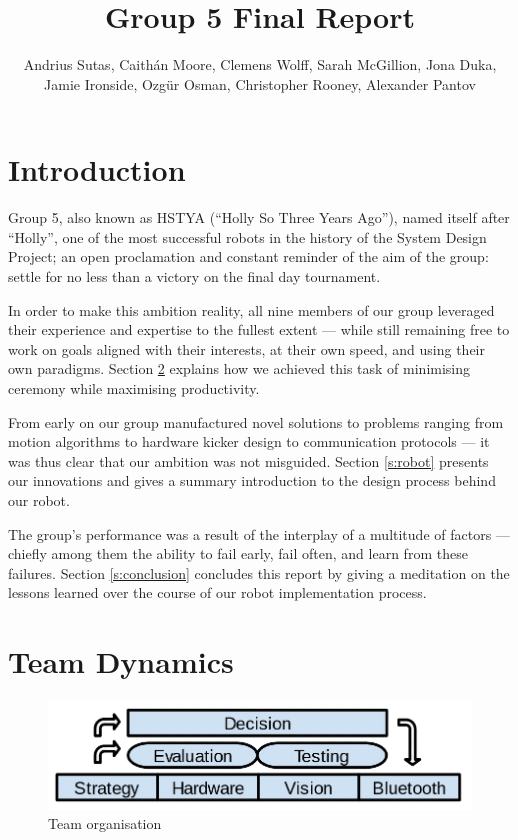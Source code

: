 \documentclass[journal,a4paper,12pt]{IEEEtran}
\title{Group 5 Final Report}
\author{Andrius Sutas, Caith\'{a}n Moore, Clemens Wolff, Sarah McGillion, Jona Duka, Jamie Ironside, Ozg\"{u}r Osman, Christopher Rooney, Alexander Pantov}
\begin{document}
\maketitle


\section{Introduction}\label{s:introduction}

Group 5, also known as HSTYA (``Holly So Three Years Ago''), named itself after ``Holly'', one of the most successful robots in the history of the System Design Project; an open proclamation and constant reminder of the aim of the group: settle for no less than a victory on the final day tournament.

In order to make this ambition reality, all nine members of our group leveraged their experience and expertise to the fullest extent --- while still remaining free to work on goals aligned with their interests, at their own speed, and using their own paradigms. Section \ref{s:team} explains how we achieved this task of minimising ceremony while maximising productivity.

From early on our group manufactured novel solutions to problems ranging from motion algorithms to hardware kicker design to communication protocols --- it was thus clear that our ambition was not misguided. Section \ref{s:robot} presents our innovations and gives a summary introduction to the design process behind our robot.

The group's performance was a result of the interplay of a multitude of factors --- chiefly among them the ability to fail early, fail often, and learn from these failures. Section \ref{s:conclusion} concludes this report by giving a meditation on the lessons learned over the course of our robot implementation process.


\section{Team Dynamics}\label{s:team}

\begin{figure}[!htb]
\centering
  \includegraphics[width=\columnwidth]{organisation.png}
  \caption{Team organisation}
  \label{f:organisation}
\end{figure}
\end{document}
